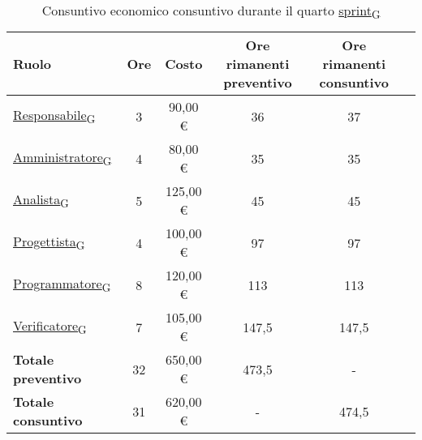 \begin{table}[!h]
	\centering
	\begin{tabular}{ | l | c | c | c | c | c | }
		\hline
		\textbf{Ruolo}             & \textbf{Ore} & \textbf{Costo} & \textbf{Ore rimanenti preventivo} & \textbf{Ore rimanenti consuntivo} \\
		\hline
		\href{https://7last.github.io/docs/rtb/documentazione-interna/glossario\#responsabile}{Responsabile\textsubscript{G}}               & 3            & 90,00 €        & 36                                & 37                                \\
		\href{https://7last.github.io/docs/rtb/documentazione-interna/glossario\#amministratore}{Amministratore\textsubscript{G}}             & 4            & 80,00 €        & 35                                & 35                                \\
		\href{https://7last.github.io/docs/rtb/documentazione-interna/glossario\#analista}{Analista\textsubscript{G}}                   & 5            & 125,00 €       & 45                                & 45                                \\
		\href{https://7last.github.io/docs/rtb/documentazione-interna/glossario\#progettista}{Progettista\textsubscript{G}}                & 4            & 100,00 €       & 97                                & 97                                \\
		\href{https://7last.github.io/docs/rtb/documentazione-interna/glossario\#programmatore}{Programmatore\textsubscript{G}}              & 8            & 120,00 €       & 113                               & 113                               \\
		\href{https://7last.github.io/docs/rtb/documentazione-interna/glossario\#verificatore}{Verificatore\textsubscript{G}}               & 7            & 105,00 €       & 147,5                             & 147,5                             \\
		\hline
		\textbf{Totale preventivo} & 32           & 650,00 €       & 473,5                             & -                                 \\
		\hline
		\textbf{Totale consuntivo} & 31           & 620,00 €       & -                                 & 474,5                             \\
		\hline
	\end{tabular}
	\caption{Consuntivo economico consuntivo durante il quarto \href{https://7last.github.io/docs/rtb/documentazione-interna/glossario\#sprint}{sprint\textsubscript{G}}}
	
\end{table}

